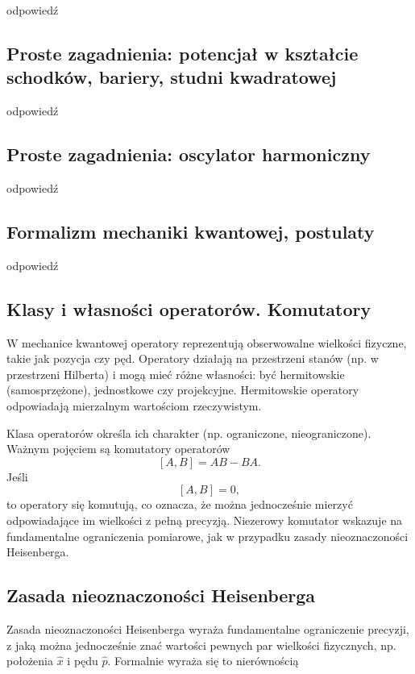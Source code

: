 odpowiedź

\subsection{Proste zagadnienia: potencjał w kształcie schodków, bariery, studni kwadratowej}

odpowiedź

\subsection{Proste zagadnienia: oscylator harmoniczny}

odpowiedź

\subsection{Formalizm mechaniki kwantowej, postulaty}

odpowiedź

\subsection{Klasy i własności operatorów. Komutatory}

W mechanice kwantowej operatory reprezentują obserwowalne wielkości fizyczne, takie jak pozycja czy pęd. Operatory działają na przestrzeni stanów (np. w przestrzeni Hilberta) i mogą mieć różne własności: być hermitowskie (samosprzężone), jednostkowe czy projekcyjne. Hermitowskie operatory odpowiadają mierzalnym wartościom rzeczywistym.

Klasa operatorów określa ich charakter (np. ograniczone, nieograniczone). Ważnym pojęciem są komutatory operatorów
\[
[A, B] = AB - BA.
\]
Jeśli
\[
[A, B] = 0,
\]
to operatory się komutują, co oznacza, że można jednocześnie mierzyć odpowiadające im wielkości z pełną precyzją. Niezerowy komutator wskazuje na fundamentalne ograniczenia pomiarowe, jak w przypadku zasady nieoznaczoności Heisenberga.

\subsection{Zasada nieoznaczoności Heisenberga}

Zasada nieoznaczoności Heisenberga wyraża fundamentalne ograniczenie precyzji, z jaką można jednocześnie znać wartości pewnych par wielkości fizycznych, np. położenia \( \hat{x} \) i pędu \( \hat{p} \). Formalnie wyraża się to nierównością

